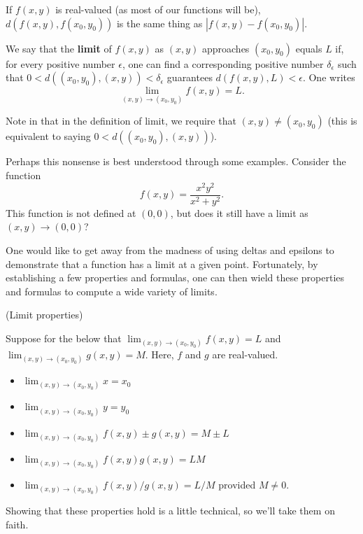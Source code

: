 \documentclass{article}
\begin{document}
If $f(x,y)$ is real-valued (as most of our functions will be), $d(f(x,y),f(x_0,y_0))$ is the same thing as $|f(x,y) - f(x_0,y_0)|$.

\begin{definition}
    We say that the \textbf{limit} of $f(x,y)$ as $(x,y)$ approaches $(x_0,y_0)$ equals $L$ if, 
    for every positive number $\epsilon$, one can find a corresponding positive number $\delta_\epsilon$ such that
    $0 < d((x_0,y_0),(x,y)) < \delta_\epsilon$ guarantees $d(f(x,y),L) < \epsilon$. One writes
    \[\lim_{(x,y)\to (x_0,y_0)} f(x,y) = L.\]
\end{definition}

Note in that in the definition of limit, we require that $(x,y) \neq (x_0,y_0)$ 
(this is equivalent to saying $0 < d((x_0,y_0),(x,y))$).


Perhaps this nonsense is best understood through some examples. Consider the function 
\[f(x,y)=\frac{x^2 y^2}{x^2+y^2}.\]
This function is not defined at $(0,0)$, but does it still have a limit as $(x,y) \to (0,0)$? 

One would like to get away from the madness of using deltas and epsilons to demonstrate that a function
has a limit at a given point. Fortunately, by establishing a few properties and formulas, one can then wield
these properties and formulas to compute a wide variety of limits.

\begin{proposition} (Limit properties)


Suppose for the below that $\lim_{(x,y) \to (x_0,y_0)} f(x,y) = L$ and $\lim_{(x,y) \to (x_0,y_0)} g(x,y) = M$. Here,
$f$ and $g$ are real-valued.
    \begin{itemize}
        \item $\lim_{(x,y) \to (x_0,y_0)} x = x_0$ 
        \item $\lim_{(x,y) \to (x_0,y_0)} y = y_0$
        \item $\lim_{(x,y) \to (x_0,y_0)} f(x,y) \pm g(x,y) = M \pm L$
        \item $\lim_{(x,y) \to (x_0,y_0)} f(x,y)g(x,y) = LM$
        \item $\lim_{(x,y) \to (x_0,y_0)} f(x,y)/g(x,y) = L/M$ provided $M\neq 0$.
    \end{itemize}
\end{proposition}

Showing that these properties hold is a little technical, so we'll take them on faith.
\end{document}
